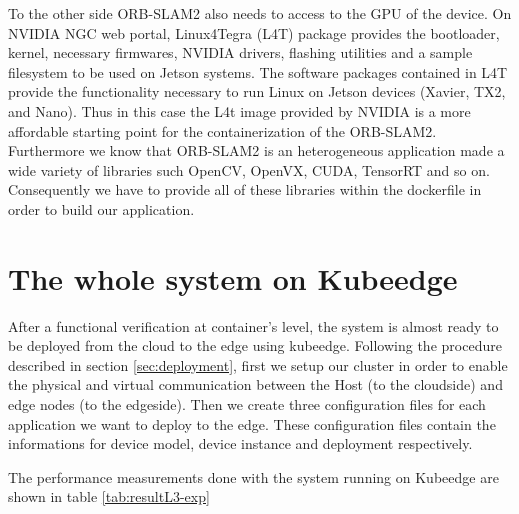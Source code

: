 To the other side ORB-SLAM2 also needs to access to the GPU of the device.
On NVIDIA NGC web portal, Linux4Tegra (L4T) package provides the bootloader, kernel, necessary firmwares, NVIDIA drivers, flashing utilities and a sample filesystem to be used on Jetson systems. The software packages contained in L4T provide the functionality necessary to run Linux on Jetson devices (Xavier, TX2, and Nano).
Thus in this case the L4t image provided by NVIDIA is a more affordable starting point for the containerization of the ORB-SLAM2.
Furthermore we know that ORB-SLAM2 is an heterogeneous application made a wide variety of libraries such OpenCV, OpenVX, CUDA, TensorRT and so on.
Consequently we have to provide all of these libraries within the dockerfile in order to build our application.




\section{The whole system on Kubeedge}
After a functional verification at container's level, the system is almost ready to be deployed from the cloud to the edge using kubeedge.
Following the procedure described in section \ref{sec:deployment}, first we setup our cluster in order to enable the physical and virtual communication between the Host (to the cloudside) and edge nodes (to the edgeside).
Then we create three configuration files for each application we want to deploy to the edge.
These configuration files contain the informations for device model, device instance and deployment respectively.





The performance measurements done with the system running on Kubeedge are shown in table \ref{tab:resultL3-exp}




